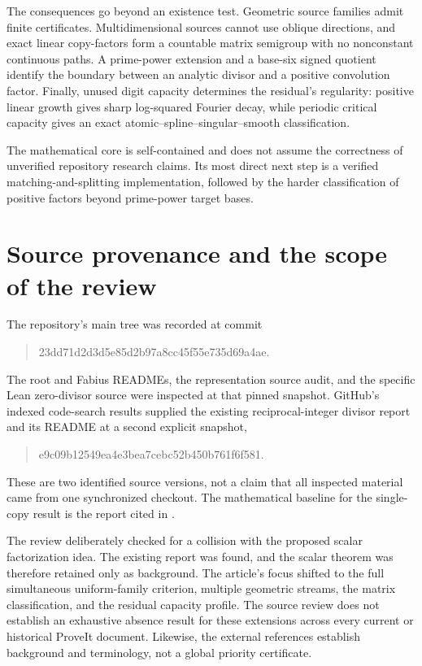 \documentclass[11pt,a4paper]{article}
\theoremstyle{remark}
\begin{document}
The consequences go beyond an existence test. Geometric source families admit
finite certificates. Multidimensional sources cannot use oblique directions,
and exact linear copy-factors form a countable matrix semigroup with no
nonconstant continuous paths.
A prime-power extension and a base-six signed quotient identify the boundary
between an analytic divisor and a positive convolution factor. Finally, unused
digit capacity determines the residual's regularity: positive linear growth
gives sharp log-squared Fourier decay, while periodic critical capacity gives an
exact atomic--spline--singular--smooth classification.

The mathematical core is self-contained and does not assume the correctness of
unverified repository research claims. Its most direct next step is a verified
matching-and-splitting implementation, followed by the harder classification of
positive factors beyond prime-power target bases.

\clearpage
\appendix
\section{Source provenance and the scope of the review}
\label{app:sources}

The repository's main tree was recorded at commit
\begin{quote}\small\ttfamily
23dd71d2d3d5e85d2b97a8cc45f55e735d69a4ae.
\end{quote}
The root and Fabius READMEs, the representation source audit, and the specific
Lean zero-divisor source were inspected at that pinned snapshot. GitHub's
indexed code-search results supplied the existing reciprocal-integer divisor
report and its README at a second explicit snapshot,
\begin{quote}\small\ttfamily
e9c09b12549ea4e3bea7cebc52b450b761f6f581.
\end{quote}
These are two identified source versions, not a claim that all inspected
material came from one synchronized checkout. The mathematical baseline for
the single-copy result is the report cited in \cite{RepoDivisors}.

The review deliberately checked for a collision with the proposed scalar
factorization idea. The existing report was found, and the scalar theorem was
therefore retained only as background. The article's focus shifted to the full
simultaneous uniform-family criterion, multiple geometric streams, the matrix
classification, and the residual capacity profile. The source review does not
establish an exhaustive absence result for these extensions across every current
or historical ProveIt document. Likewise, the external references establish
background and terminology, not a global priority certificate.
\end{document}
